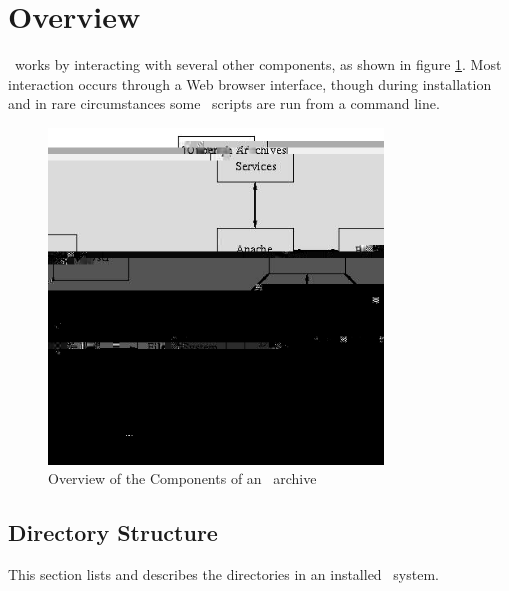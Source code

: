 
\section{Overview}

\eprints\ works by interacting with several other components, as shown in figure \ref{fig_components}. Most interaction occurs through a Web browser interface, though during installation and in rare circumstances some \eprints\ scripts are run from a command line.

\begin{figure}
\centerline{\includegraphics[width=3.5in]{images/components}} 
\caption{\label{fig_components} Overview of the Components of an \eprints\ archive}
\end{figure}

\subsection{Directory Structure}

This section lists and describes the directories in an installed \eprints\ system.

